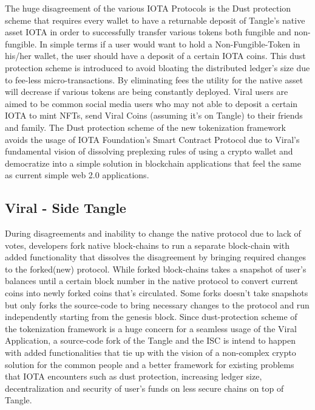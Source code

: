 \documentclass[10pt]{article}
\begin{document}
The huge disagreement of the various IOTA Protocols is the Dust protection scheme that requires every wallet to have a returnable deposit of Tangle's native asset IOTA in order to successfully transfer various tokens both fungible and non-fungible. In simple terms if a user would want to hold a Non-Fungible-Token in his/her wallet, the user should have a deposit of a certain IOTA coins. This dust protection scheme is introduced to avoid bloating the distributed ledger's size due to fee-less micro-transactions. By eliminating fees the utility for the native asset will decrease if various tokens are being constantly deployed. Viral users are aimed to be common social media users who may not able to deposit a certain IOTA to mint NFTs, send Viral Coins (assuming it's on Tangle) to their friends and family. The Dust protection scheme of the new tokenization framework avoids the usage of IOTA Foundation's Smart Contract Protocol due to Viral's fundamental vision of dissolving preplexing rules of using a crypto wallet and democratize into a simple solution in blockchain applications that feel the same as current simple web 2.0 applications.

\subsection{Viral - Side Tangle}

During disagreements and inability to change the native protocol due to lack of votes, developers fork native block-chains to run a separate block-chain with added functionality that dissolves the disagreement by bringing required changes to the forked(new) protocol. While forked block-chains takes a snapshot of user's balances until a certain block number in the native protocol to convert current coins into newly forked coins that's circulated. Some forks doesn't take snapshots but only forks the source-code to bring necessary changes to the protocol and run independently starting from the genesis block. Since dust-protection scheme of the tokenization framework is a huge concern for a seamless usage of the Viral Application, a source-code fork of the Tangle and the ISC is intend to happen with added functionalities that tie up with the vision of a non-complex crypto solution for the common people and a better framework for existing problems that IOTA encounters such as dust protection, increasing ledger size, decentralization and security of user's funds on less secure chains on top of Tangle.
\end{document}

